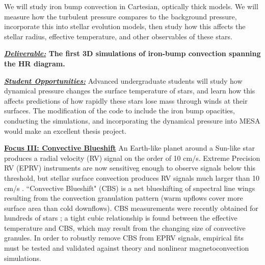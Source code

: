 \documentclass[12pt]{article}
\newcommand{\sct}[1]{\vspace{0.3cm}\hspace{-\parindent}\textbf{\underline{#1}}\hspace{0.3cm}}
\begin{document}

We will study iron bump convection in Cartesian, optically thick models.
We will measure how the turbulent pressure compares to the background pressure, incorporate this into stellar evolution models, then study how this affects the stellar radius, effective temperature, and other observables of these stars.

\textbf{\underline{\emph{Deliverable:}} The first 3D simulations of iron-bump convection spanning the HR diagram.}

\textbf{\underline{\emph{Student Opportunities:}}} Advanced undergraduate students will study how dynamical pressure changes the surface temperature of stars, and learn how this affects predictions of how rapidly these stars lose mass through winds at their surfaces.
The modification of the code to include the iron bump opacities, conducting the simulations, and incorporating the dynamical pressure into MESA would make an excellent thesis project.

\sct{Focus III: Convective Blueshift}
An Earth-like planet around a Sun-like star produces a radial velocity (RV) signal on the order of 10 cm/s.
Extreme Precision RV (EPRV) instruments are now sensitiveg enough to observe signals below this threshold, but stellar surface convection produces RV signals much larger than 10 cm/s \citep{crass_etal_2021}.
``Convective Blueshift" (CBS) is a net blueshifting of snpectral line wings resulting from the convection granulation pattern (warm upflows cover more surface area than cold downflows).
CBS measurements were recently obtained for hundreds of stars \citep{liebing_etal_2021}; a tight cubic relationship is found between the effective temperature and CBS, which may result from the changing size of convective granules. %
In order to robustly remove CBS from EPRV signals, empirical fits must be tested and validated against theory and nonlinear magnetoconvection simulations. 
\end{document}
